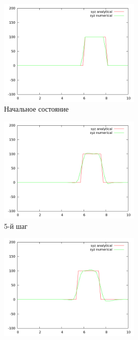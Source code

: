 \begin{figure}[H]
\begin{subfigure}[b]{0.5\textwidth}
\centering
\includegraphics[width=0.75\textwidth]{png/veryfication/0.4/s-wave-along-z0.png}
\caption{Начальное состояние}
\end{subfigure}
\begin{subfigure}[b]{0.5\textwidth}
\centering
\includegraphics[width=0.75\textwidth]{png/veryfication/0.4/s-wave-along-z5.png}
\caption{5-й шаг}
\end{subfigure}
\begin{subfigure}[b]{0.5\textwidth}
\centering
\includegraphics[width=0.75\textwidth]{png/veryfication/0.4/s-wave-along-z10.png}

\end{subfigure}
\end{figure}
